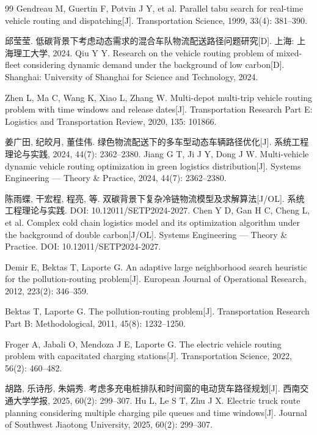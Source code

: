 \documentclass{setp-new}
\begin{document}
\begin{thebibliography}{99}
 Gendreau M, Guertin F, Potvin J Y, et al. Parallel tabu search for real-time vehicle routing and dispatching[J]. Transportation Science, 1999, 33(4): 381--390.

 邱莹莹. 低碳背景下考虑动态需求的混合车队物流配送路径问题研究[D]. 上海: 上海理工大学, 2024.\newline
Qiu Y Y. Research on the vehicle routing problem of mixed-fleet considering dynamic demand under the background of low carbon[D]. Shanghai: University of Shanghai for Science and Technology, 2024.

 Zhen L, Ma C, Wang K, Xiao L, Zhang W. Multi-depot multi-trip vehicle routing problem with time windows and release dates[J]. Transportation Research Part E: Logistics and Transportation Review, 2020, 135: 101866.

 姜广田, 纪皎月, 董佳伟. 绿色物流配送下的多车型动态车辆路径优化[J]. 系统工程理论与实践, 2024, 44(7): 2362--2380.\newline
Jiang G T, Ji J Y, Dong J W. Multi-vehicle dynamic vehicle routing optimization in green logistics distribution[J]. Systems Engineering --- Theory \& Practice, 2024, 44(7): 2362--2380.

 陈雨蝶, 干宏程, 程亮, 等. 双碳背景下复杂冷链物流模型及求解算法[J/OL]. 系统工程理论与实践. DOI: 10.12011/SETP2024-2027.\newline
Chen Y D, Gan H C, Cheng L, et al. Complex cold chain logistics model and its optimization algorithm under the background of double carbon[J/OL]. Systems Engineering --- Theory \& Practice. DOI: 10.12011/SETP2024-2027.

 Demir E, Bektas T, Laporte G. An adaptive large neighborhood search heuristic for the pollution-routing problem[J]. European Journal of Operational Research, 2012, 223(2): 346--359.

 Bektas T, Laporte G. The pollution-routing problem[J]. Transportation Research Part B: Methodological, 2011, 45(8): 1232--1250.

 Froger A, Jabali O, Mendoza J E, Laporte G. The electric vehicle routing problem with capacitated charging stations[J]. Transportation Science, 2022, 56(2): 460--482.

 胡路, 乐诗彤, 朱娟秀. 考虑多充电桩排队和时间窗的电动货车路径规划[J]. 西南交通大学学报, 2025, 60(2): 299--307.\newline
Hu L, Le S T, Zhu J X. Electric truck route planning considering multiple charging pile queues and time windows[J]. Journal of Southwest Jiaotong University, 2025, 60(2): 299--307.


\end{thebibliography}
\end{document}
